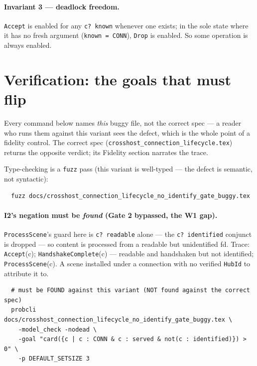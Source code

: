\documentclass[a4paper,10pt,fleqn]{article}
\begin{document}
\paragraph{Invariant 3 --- deadlock freedom.}
\texttt{Accept} is enabled for any \texttt{c? \notin known} whenever one
exists; in the sole state where it has no fresh argument
(\texttt{known = CONN}), \texttt{Drop} is enabled.  So some operation is
always enabled.

\section{Verification: the goals that must flip}
\label{sec:verify}

Every command below names \emph{this} buggy file, not the correct spec ---
a reader who runs them against this variant sees the defect, which is the
whole point of a fidelity control.  The correct spec
(\texttt{crosshost\_connection\_lifecycle.tex}) returns the opposite
verdict; its Fidelity section narrates the trace.

Type-checking is a \texttt{fuzz} pass (this variant is well-typed --- the
defect is semantic, not syntactic):
\begin{verbatim}
  fuzz docs/crosshost_connection_lifecycle_no_identify_gate_buggy.tex
\end{verbatim}

\paragraph{I2's negation must be \emph{found} (Gate 2 bypassed, the W1 gap).}
\texttt{ProcessScene}'s guard here is \texttt{c? \in readable} alone --- the
\texttt{c? \in identified} conjunct is dropped --- so content is processed
from a readable but unidentified fd.  Trace: \texttt{Accept}(c);
\texttt{HandshakeComplete}(c) --- readable and handshaken but not
identified; \texttt{ProcessScene}(c).  A scene installed under a connection
with no verified \texttt{HubId} to attribute it to.
\begin{verbatim}
  # must be FOUND against this variant (NOT found against the correct spec)
  probcli docs/crosshost_connection_lifecycle_no_identify_gate_buggy.tex \
    -model_check -nodead \
    -goal "card({c | c : CONN & c : served & not(c : identified)}) > 0" \
    -p DEFAULT_SETSIZE 3
\end{verbatim}
\end{document}
